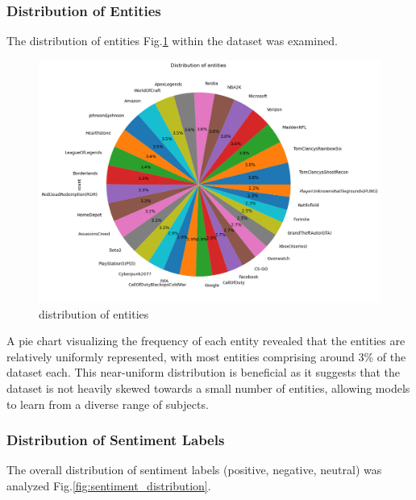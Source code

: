\subsubsection{Distribution of Entities}

The distribution of entities Fig.\ref{fig:entity_distribution} within the dataset was examined. 

\begin{figure}[h!]
    \centering
    \includegraphics[width=1\linewidth]{images/entity_distribution.png}
    \caption{distribution of entities}
    \label{fig:entity_distribution}
\end{figure}

A pie chart visualizing the frequency of each entity revealed that the entities are relatively uniformly represented, with most entities comprising around 3\% of the dataset each. This near-uniform distribution is beneficial as it suggests that the dataset is not heavily skewed towards a small number of entities, allowing models to learn from a diverse range of subjects.



\subsubsection{Distribution of Sentiment Labels}

The overall distribution of sentiment labels (positive, negative, neutral) was analyzed Fig.\ref{fig:sentiment_distribution}. 

